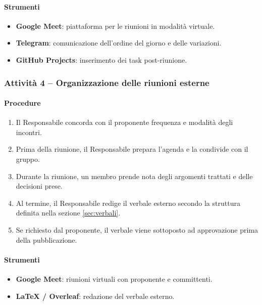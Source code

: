 \documentclass[a4paper, 11pt, oneside]{scrartcl}
\begin{document}
\paragraph{Strumenti}
\begin{itemize}
    \item \textbf{Google Meet}: piattaforma per le riunioni in modalità virtuale.
    \item \textbf{Telegram}: comunicazione dell'ordine del giorno e delle variazioni.
    \item \textbf{GitHub Projects}: inserimento dei task post-riunione.
\end{itemize}

\subsubsection{Attività 4 – Organizzazione delle riunioni esterne}

\paragraph{Procedure}
\begin{enumerate}
    \item Il Responsabile concorda con il proponente frequenza e modalità degli incontri.
    \item Prima della riunione, il Responsabile prepara l'agenda e la condivide con il gruppo.
    \item Durante la riunione, un membro prende nota degli argomenti trattati e delle decisioni prese.
    \item Al termine, il Responsabile redige il verbale esterno secondo la struttura definita nella sezione \ref{sec:verbali}.
    \item Se richiesto dal proponente, il verbale viene sottoposto ad approvazione prima della pubblicazione.
\end{enumerate}

\paragraph{Strumenti}
\begin{itemize}
    \item \textbf{Google Meet}: riunioni virtuali con proponente e committenti.
    \item \textbf{\LaTeX{} / Overleaf}: redazione del verbale esterno.
\end{itemize}

\end{document}
